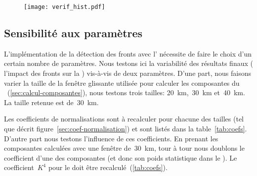 \begin{figure}
  \centering
  \texttt{[image: verif\_hist.pdf]}
  \label{fig:verif-hist}
\end{figure}

\subsection{Sensibilité aux paramètres}
\label{sec:sensibilite-parametres}

L'implémentation de la détection des fronts avec l' nécessite de faire le choix d'un certain nombre de paramètres. Nous testons ici la variabilité des résultats finaux ( l'impact des fronts sur la ) vis-à-vis de deux paramètres.
D'une part, nous faisons varier la taille de la fenêtre glissante utilisée pour calculer les composantes du ~(\cref{sec:calcul-composantes}), nous testons trois tailles: \qty{20}{\km},~\qty{30}{\km} et~\qty{40}{\km}. La taille retenue est de~\qty{30}{\km}.

Les coefficients de normalisations sont à recalculer pour chacune des tailles (tel que décrit figure~\ref{sec:coef-normalisation}) et sont listés dans la table~\ref{tab:coefs}.
D'autre part nous testons l'influence de ces coefficients. En prenant les composantes calculées avec une fenêtre de~\qty{30}{\km}, tour à tour nous doublons le coefficient d'une des composantes (et donc son poids statistique dans le ). Le coefficient~\(K^4\) pour le  doit être recalculé~(\cref{tab:coefs}).

